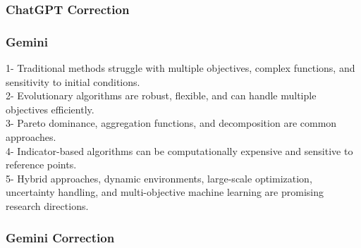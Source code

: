 \subsubsection{ChatGPT Correction}
\begin{tcolorbox}[breakable]
    
\end{tcolorbox}
\subsubsection{Gemini}
\begin{tcolorbox}[breakable]
1- Traditional methods struggle with multiple objectives, complex functions, and sensitivity to initial conditions.\\
2- Evolutionary algorithms are robust, flexible, and can handle multiple objectives efficiently.\\
3- Pareto dominance, aggregation functions, and decomposition are common approaches.\\
4- Indicator-based algorithms can be computationally expensive and sensitive to reference points.\\
5- Hybrid approaches, dynamic environments, large-scale optimization, uncertainty handling, and multi-objective machine learning are promising research directions.\\
\end{tcolorbox}
\subsubsection{Gemini Correction}
\begin{tcolorbox}[breakable]
    
\end{tcolorbox}
